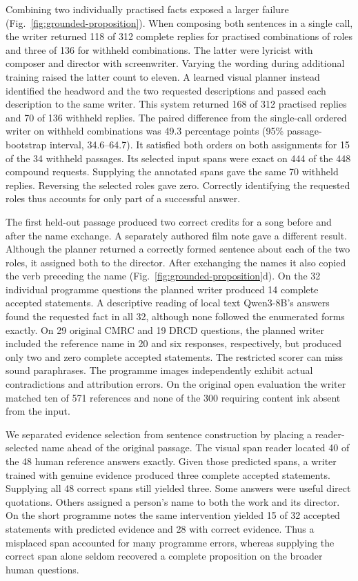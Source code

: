 \documentclass[12pt,a4paper]{article}
\providecommand{\DIFadd}[1]{{\protect\color{blue} \sf #1}} %
\begin{document}
\DIFadd{Combining two individually practised facts exposed a larger failure (Fig.~\ref{fig:grounded-proposition}). When composing both sentences in a single call, the writer returned 118 of 312 complete replies for practised combinations of roles and three of 136 for withheld combinations. The latter were lyricist with composer and director with screenwriter. Varying the wording during additional training raised the latter count to eleven. A learned visual planner instead identified the headword and the two requested descriptions and passed each description to the same writer. This system returned 168 of 312 practised replies and 70 of 136 withheld replies. The paired difference from the single-call ordered writer on withheld combinations was 49.3 percentage points (95\% passage-bootstrap interval, 34.6--64.7). It satisfied both orders on both assignments for 15 of the 34 withheld passages. Its selected input spans were exact on 444 of the 448 compound requests. Supplying the annotated spans gave the same 70 withheld replies. Reversing the selected roles gave zero. Correctly identifying the requested roles thus accounts for only part of a successful answer.
}

\DIFadd{The first held-out passage produced two correct credits for a song before and after the name exchange. A separately authored film note gave a different result. Although the planner returned a correctly formed sentence about each of the two roles, it assigned both to the director. After exchanging the names it also copied the verb preceding the name (Fig.~\ref{fig:grounded-proposition}d). On the 32 individual programme questions the planned writer produced 14 complete accepted statements. A descriptive reading of local text Qwen3-8B's answers found the requested fact in all 32, although none followed the enumerated forms exactly. On 29 original CMRC and 19 DRCD questions, the planned writer included the reference name in 20 and six responses, respectively, but produced only two and zero complete accepted statements. The restricted scorer can miss sound paraphrases. The programme images independently exhibit actual contradictions and attribution errors. On the original open evaluation the writer matched ten of 571 references and none of the 300 requiring content ink absent from the input.
}

\DIFadd{We separated evidence selection from sentence construction by placing a reader-selected name ahead of the original passage. The visual span reader located 40 of the 48 human reference answers exactly. Given those predicted spans, a writer trained with genuine evidence produced three complete accepted statements. Supplying all 48 correct spans still yielded three. Some answers were useful direct quotations. Others assigned a person's name to both the work and its director. On the short programme notes the same intervention yielded 15 of 32 accepted statements with predicted evidence and 28 with correct evidence. Thus a misplaced span accounted for many programme errors, whereas supplying the correct span alone seldom recovered a complete proposition on the broader human questions.
}
\end{document}

